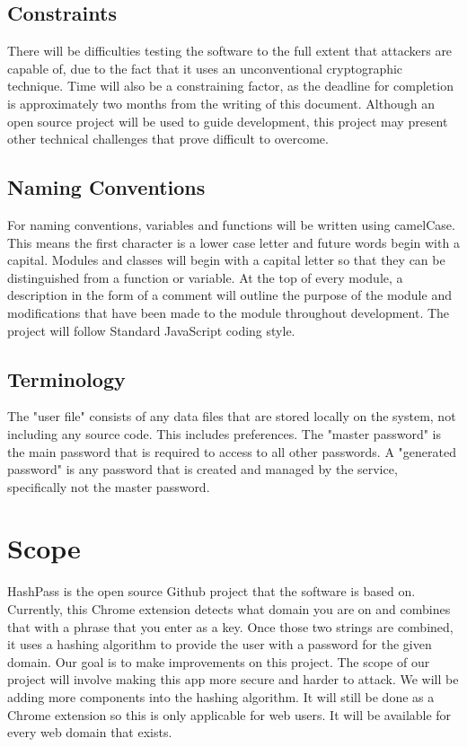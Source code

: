 \documentclass[12pt]{article}
\begin{document}
\subsection{Constraints}
There will be difficulties testing the software to the full extent that attackers are capable of, due to the fact that it uses an unconventional cryptographic technique.  Time will also be a constraining factor, as the deadline for completion is approximately two months from the writing of this document. Although an open source project will be used to guide development, this project may present other technical challenges that prove difficult to overcome.

\subsection{Naming Conventions}
For naming conventions, variables and functions will be written using camelCase. This means the first character is a lower case letter and future words begin with a capital. Modules and classes will begin with a capital letter so that they can be distinguished from a function or variable. At the top of every module, a description in the form of a comment will outline the purpose of the module and modifications that have been made to the module throughout development. The project will follow Standard JavaScript coding style.

\subsection{Terminology}
The "user file" consists of any data files that are stored locally on the system, not including any source code. This includes preferences. The "master password" is the main password that is required to access to all other passwords. A "generated password" is any password that is created and managed by the service, specifically not the master password.

\section{Scope}
HashPass is the open source Github project that the software is based on. Currently, this Chrome extension detects what domain you are on and combines that with a phrase that you enter as a key. Once those two strings are combined, it uses a hashing algorithm to provide the user with a password for the given domain. Our goal is to make improvements on this project. The scope of our project will involve making this app more secure and harder to attack. We will be adding more components into the hashing algorithm. It will still be done as a Chrome extension so this is only applicable for web users. It will be available for every web domain that exists. 
\end{document}
